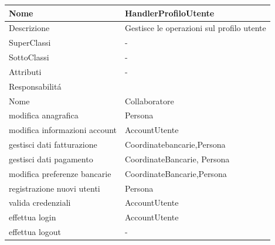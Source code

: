 \begin{center} %
    \begin{longtable}{ |p{3cm}|p{3cm}|p{3cm}|p{3cm}| }
        \hline
        Nome & \multicolumn{3}{|p{9cm}|}{HandlerProfiloUtente} \\\hline
        Descrizione & \multicolumn{3}{|p{9cm}|}{Gestisce le operazioni sul profilo utente} \\\hline
        SuperClassi & \multicolumn{3}{|p{9cm}|}{-} \\\hline
        SottoClassi & \multicolumn{3}{|p{9cm}|}{-} \\\hline
        Attributi & \multicolumn{3}{|p{9cm}|}{-} \\\hline
        \multicolumn{4}{|p{12cm}|}{Responsabilit\'a} \\\hline %
        \multicolumn{2}{|p{6cm}|}{Nome} & \multicolumn{2}{|p{6cm}|}{Collaboratore} \\\hline %
        \multicolumn{2}{|p{6cm}|}{modifica anagrafica} & \multicolumn{2}{|p{6cm}|}{Persona} \\\hline
        \multicolumn{2}{|p{6cm}|}{modifica informazioni account} & \multicolumn{2}{|p{6cm}|}{AccountUtente} \\\hline
        \multicolumn{2}{|p{6cm}|}{gestisci dati fatturazione} & \multicolumn{2}{|p{6cm}|}{Coordinatebancarie,Persona} \\\hline
        \multicolumn{2}{|p{6cm}|}{gestisci dati pagamento} & \multicolumn{2}{|p{6cm}|}{CoordinateBancarie, Persona} \\\hline
        \multicolumn{2}{|p{6cm}|}{modifica preferenze bancarie} & \multicolumn{2}{|p{6cm}|}{CoordinateBancarie,Persona} \\\hline
        \multicolumn{2}{|p{6cm}|}{registrazione nuovi utenti} & \multicolumn{2}{|p{6cm}|}{Persona} \\\hline
        \multicolumn{2}{|p{6cm}|}{valida credenziali} & \multicolumn{2}{|p{6cm}|}{AccountUtente} \\\hline
        \multicolumn{2}{|p{6cm}|}{effettua login} & \multicolumn{2}{|p{6cm}|}{AccountUtente} \\\hline
        \multicolumn{2}{|p{6cm}|}{effettua logout} & \multicolumn{2}{|p{6cm}|}{-} \\\hline
    \end{longtable}
\end{center}

